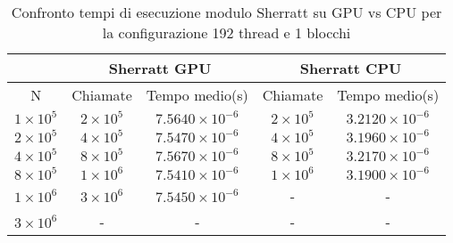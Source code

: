\begin{table}[ht!]
    \begin{center}
        \renewcommand{\arraystretch}{1.5}
        \begin{adjustbox}{width=.65\textwidth}
            \begin{tabular}{ |c|c|c|c|c| }
                \hline
                \multicolumn{1}{|c}{} & \multicolumn{2}{|c}{Sherratt GPU} & \multicolumn{2}{|c|}{Sherratt CPU} \\
                \hline
                 N & Chiamate & Tempo medio(s) & Chiamate & Tempo medio(s) \\
                \hline 
                $1 \times 10^5$ & $2 \times 10^{5}$ & $7.5640 \times 10^{-6}$  & $2 \times 10^{5}$ & $3.2120 \times 10^{-6}$ \\ 
                \hline 
                $2 \times 10^5$ & $4 \times 10^{5}$ & $7.5470 \times 10^{-6}$  & $4 \times 10^{5}$ & $3.1960 \times 10^{-6}$ \\ 
                \hline 
                $4 \times 10^5$ & $8 \times 10^{5}$ & $7.5670 \times 10^{-6}$  & $8 \times 10^{5}$ & $3.2170 \times 10^{-6}$ \\ 
                \hline
                $8 \times 10^5$ & $1 \times 10^{6}$ & $7.5410 \times 10^{-6}$  & $1 \times 10^{6}$ & $3.1900 \times 10^{-6}$ \\ 
                \hline 
                $1 \times 10^6$ & $3 \times 10^{6}$ & $7.5450 \times 10^{-6}$  & - & - \\ 
                \hline 
                $3 \times 10^6$ & - & - & - & - \\ 
                \hline 
            \end{tabular}
        \end{adjustbox}
    \end{center}
    \caption{Confronto tempi di esecuzione modulo Sherratt su GPU vs CPU per la configurazione 192 thread e 1 blocchi}
    \label{tab:sherratt_kernel_table_192x1}
\end{table}

